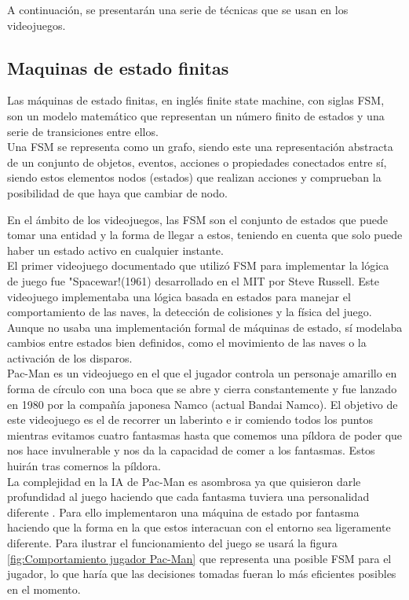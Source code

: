 A continuación, se presentarán una serie de técnicas que se usan en los videojuegos.
\subsection{Maquinas de estado finitas}
Las máquinas de estado finitas, en inglés finite state machine, con siglas FSM, son un modelo matemático que representan un número finito de estados y una serie de transiciones entre ellos. \\

Una FSM se representa como un grafo, siendo este una representación abstracta de un conjunto de objetos, eventos, acciones o propiedades conectados entre sí, siendo estos elementos nodos (estados) que realizan acciones y comprueban la posibilidad de que haya que cambiar de nodo. 

En el ámbito de los videojuegos, las FSM son el conjunto de estados que puede tomar una entidad y la forma de llegar a estos, teniendo en cuenta que solo puede haber un estado activo en cualquier instante. \\

El primer videojuego documentado que utilizó FSM para implementar la lógica de juego fue "Spacewar!(1961)  desarrollado en el MIT por Steve Russell. Este videojuego implementaba una lógica basada en estados para manejar el comportamiento de las naves, la detección de colisiones y la física del juego. Aunque no usaba una implementación formal de máquinas de estado, sí modelaba cambios entre estados bien definidos, como el movimiento de las naves o la activación de los disparos. \\ 

Pac-Man es un videojuego en el que el jugador controla un personaje amarillo en forma de círculo con una boca que se abre y cierra constantemente y fue lanzado en 1980 por la compañía japonesa Namco (actual Bandai Namco). El objetivo de este videojuego es el de recorrer un laberinto e ir comiendo todos los puntos mientras evitamos cuatro fantasmas hasta que comemos una píldora de poder que nos hace invulnerable y nos da la capacidad de comer a los fantasmas. Estos huirán tras comernos la píldora.\\
La complejidad en la IA de Pac-Man es asombrosa ya que quisieron darle profundidad al juego haciendo que cada fantasma tuviera una personalidad diferente . Para ello implementaron una máquina de estado por fantasma haciendo que la forma en la que estos interacuan con el entorno sea ligeramente diferente.
Para ilustrar el funcionamiento del juego se usará la figura \ref{fig:Comportamiento jugador Pac-Man} que representa una posible FSM para el jugador, lo que haría que las decisiones tomadas fueran lo más eficientes posibles en el momento.\\

